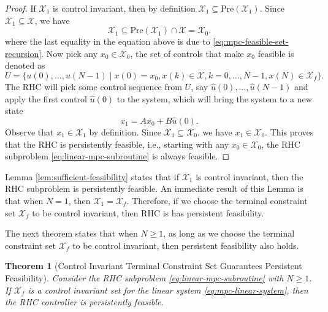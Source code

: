 \documentclass[
]{book}
\newtheorem{theorem}{Theorem}[chapter]
\theoremstyle{definition}
\theoremstyle{definition}
\theoremstyle{definition}
\theoremstyle{definition}
\theoremstyle{remark}
\begin{document}
\begin{proof}
If \(\mathcal{X}_1\) is control invariant, then by definition \(\mathcal{X}_1 \subseteq \text{Pre}(\mathcal{X}_1)\). Since \(\mathcal{X}_1 \subseteq \mathcal{X}\), we have
\[
\mathcal{X}_1 \subseteq \text{Pre}(\mathcal{X}_1) \cap \mathcal{X} = \mathcal{X}_0.
\]
where the last equality in the equation above is due to \eqref{eq:mpc-feasible-set-recursion}.
Now pick any \(x_0 \in \mathcal{X}_0\), the set of controls that make \(x_0\) feasible is denoted as
\[
U = \{ u(0),\dots,u(N-1) \mid x(0)=x_0, x(k) \in \mathcal{X},k=0,\dots,N-1,x(N) \in \mathcal{X}_f \}.
\]
The RHC will pick some control sequence from \(U\), say \(\hat{u}(0),\dots,\hat{u}(N-1)\) and apply the first control \(\hat{u}(0)\) to the system, which will bring the system to a new state
\[
x_1 = A x_0 + B \hat{u}(0).
\]
Observe that \(x_1 \in \mathcal{X}_1\) by definition. Since \(\mathcal{X}_1 \subseteq \mathcal{X}_0\), we have \(x_1 \in \mathcal{X}_0\). This proves that the RHC is persistently feasible, i.e., starting with any \(x_0 \in \mathcal{X}_0\), the RHC subproblem \eqref{eq:linear-mpc-subroutine} is always feasible.
\end{proof}

Lemma \ref{lem:sufficient-feasibility} states that if \(\mathcal{X}_1\) is control invariant, then the RHC subproblem is persistently feasible. An immediate result of this Lemma is that when \(N=1\), then \(\mathcal{X}_1 = \mathcal{X}_f\). Therefore, if we choose the terminal constraint set \(\mathcal{X}_f\) to be control invariant, then RHC is has persistent feasibility.

The next theorem states that when \(N \geq 1\), as long as we choose the terminal constraint set \(\mathcal{X}_f\) to be control invariant, then persistent feasibility also holds.

\begin{theorem}[Control Invariant Terminal Constraint Set Guarantees Persistent Feasibility]
\protect\hypertarget{thm:sufficient-feasibility-terminal}{}\label{thm:sufficient-feasibility-terminal}Consider the RHC subproblem \eqref{eq:linear-mpc-subroutine} with \(N \geq 1\). If \(\mathcal{X}_f\) is a control invariant set for the linear system \eqref{eq:mpc-linear-system}, then the RHC controller is persistently feasible.
\end{theorem}
\end{document}
